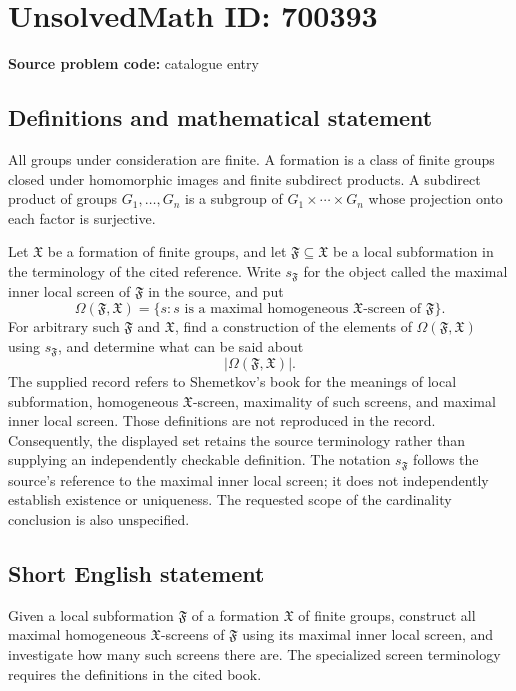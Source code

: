\documentclass[11pt]{article}
\begin{document}
\section*{UnsolvedMath ID: 700393}
\textbf{Source problem code:} catalogue entry
\subsection{Definitions and mathematical statement}
All groups under consideration are finite. A formation is a class of finite groups closed under homomorphic images and finite subdirect products. A subdirect product of groups \(G_1,\ldots,G_n\) is a subgroup of \(G_1\times\cdots\times G_n\) whose projection onto each factor is surjective.

Let \(\mathfrak X\) be a formation of finite groups, and let \(\mathfrak F\subseteq\mathfrak X\) be a local subformation in the terminology of the cited reference. Write \(s_{\mathfrak F}\) for the object called the maximal inner local screen of \(\mathfrak F\) in the source, and put
\[
\Omega(\mathfrak F,\mathfrak X)
=\bigl\{s : s\text{ is a maximal homogeneous }\mathfrak X\text{-screen of }\mathfrak F\bigr\}.
\]
For arbitrary such \(\mathfrak F\) and \(\mathfrak X\), find a construction of the elements of \(\Omega(\mathfrak F,\mathfrak X)\) using \(s_{\mathfrak F}\), and determine what can be said about
\[
\bigl|\Omega(\mathfrak F,\mathfrak X)\bigr|.
\]
The supplied record refers to Shemetkov's book for the meanings of local subformation, homogeneous \(\mathfrak X\)-screen, maximality of such screens, and maximal inner local screen. Those definitions are not reproduced in the record. Consequently, the displayed set retains the source terminology rather than supplying an independently checkable definition. The notation \(s_{\mathfrak F}\) follows the source's reference to the maximal inner local screen; it does not independently establish existence or uniqueness. The requested scope of the cardinality conclusion is also unspecified.
\subsection{Short English statement}
Given a local subformation \(\mathfrak F\) of a formation \(\mathfrak X\) of finite groups, construct all maximal homogeneous \(\mathfrak X\)-screens of \(\mathfrak F\) using its maximal inner local screen, and investigate how many such screens there are. The specialized screen terminology requires the definitions in the cited book.
\end{document}
